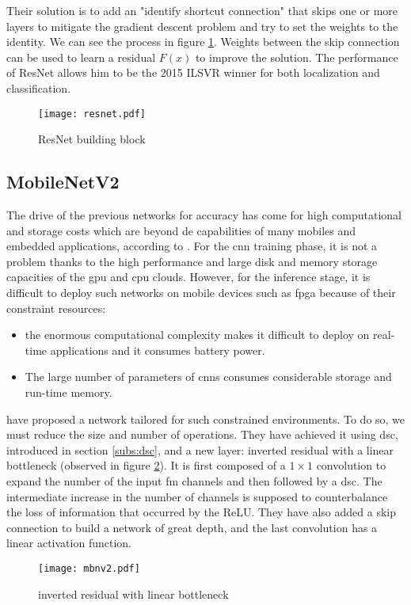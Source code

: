Their solution is to add an "identify shortcut connection" that skips one or more layers to mitigate the gradient descent problem and try to set the weights to the identity. We can see the process in figure \ref{fig:resnet}. Weights between the skip connection can be used to learn a residual $F(x)$ to improve the solution. The performance of ResNet allows him to be the 2015 ILSVR winner for both localization and classiﬁcation.
%
\begin{figure}
    \centering
    \texttt{[image: resnet.pdf]}
    \caption{ResNet building block \cite{he_deep_2015}}
    \label{fig:resnet}
\end{figure}
%
\subsection{MobileNetV2} \label{subs:mbv2}
The drive of the previous networks for accuracy has come for high computational and storage costs which are beyond de capabilities of many mobiles and embedded applications, according to \textcite{cheng_recent_2018}. For the \acrshort{cnn} training phase, it is not a problem thanks to the high performance and large disk and memory storage capacities of the \acrshort{gpu} and \acrshort{cpu} clouds. However, for the inference stage, it is difficult to deploy such networks on mobile devices such as \acrshort{fpga} because of their constraint resources:
%
\begin{itemize}
    \item the enormous computational complexity makes it difficult to deploy on real-time applications and it consumes battery power.
    \item The large number of parameters of \acrshort{cnn}s consumes considerable storage and run-time memory.
\end{itemize}

\textcite{sandler_mobilenetv2_2019} have proposed a network tailored for such constrained environments. To do so, we must reduce the size and number of operations. They have achieved it using \acrshort{dsc}, introduced in section \ref{subs:dsc}, and a new layer: inverted residual with a linear bottleneck (observed in figure \ref{fig:invreslinbot}). It is first composed of a $1 \times 1$ convolution to expand the number of the input \acrshort{fm} channels and then followed by a \acrshort{dsc}. The intermediate increase in the number of channels is supposed to counterbalance the loss of information that occurred by the ReLU. They have also added a skip connection to build a network of great depth, and the last convolution has a linear activation function.
%
\begin{figure}
    \centering
    \texttt{[image: mbnv2.pdf]}
    \caption{inverted residual with linear bottleneck \cite{sandler_mobilenetv2_2019}}
    \label{fig:invreslinbot}
\end{figure}
